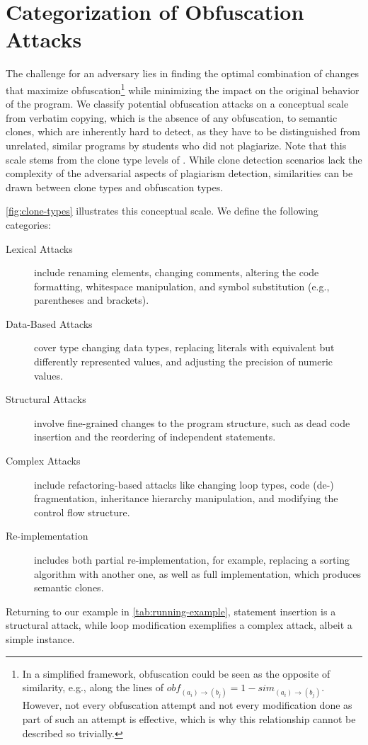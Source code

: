 \section{Categorization of Obfuscation Attacks}\label{sec:threatmodel-categorization}
The challenge for an adversary lies in finding the optimal combination of changes that maximize obfuscation\footnote{In a simplified framework, obfuscation could be seen as the opposite of similarity, e.g., along the lines of $obf_{(a_i) \rightarrow (b_j)} = 1- sim_{(a_i) \rightarrow (b_j)}$. However, not every obfuscation attempt and not every modification done as part of such an attempt is effective, which is why this relationship cannot be described so trivially.
} while minimizing the impact on the original behavior of the program.
We classify potential obfuscation attacks on a conceptual scale from verbatim copying, which is the absence of any obfuscation, to semantic clones, which are inherently hard to detect, as they have to be distinguished from unrelated, similar programs by students who did not plagiarize. Note that this scale stems from the clone type levels of \citet{Faidhi1987, Karnalim2016}. While clone detection scenarios lack the complexity of the adversarial aspects of plagiarism detection, similarities can be drawn between clone types and obfuscation types.

\autoref{fig:clone-types} illustrates this conceptual scale.
We define the following categories:
\begin{description}
    \item[Lexical Attacks] include renaming elements, changing comments, altering the code formatting, whitespace manipulation, and symbol substitution (e.g., parentheses and brackets).
    \item[Data-Based Attacks] cover type changing data types, replacing literals with equivalent but differently represented values, and adjusting the precision of numeric values.
    \item[Structural Attacks] involve fine-grained changes to the program structure, such as dead code insertion and the reordering of independent statements.
    \item[Complex Attacks] include refactoring-based attacks like changing loop types, code (de-) fragmentation, inheritance hierarchy manipulation, and modifying the control flow structure. 
    \item[Re-implementation] includes both partial re-implementation, for example, replacing a sorting algorithm with another one, as well as full implementation, which produces semantic clones.
\end{description}
Returning to our example in \autoref{tab:running-example}, statement insertion is a structural attack, while loop modification exemplifies a complex attack, albeit a simple instance.

